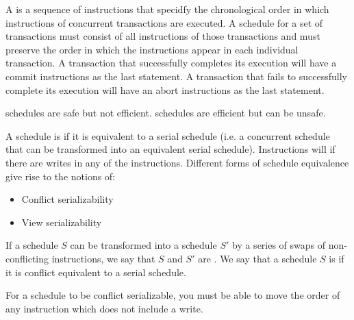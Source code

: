 \documentclass{article}
\begin{document}
A  is a sequence of instructions that specidfy the chronological order in which instructions of concurrent transactions are executed. A schedule for a set of transactions must consist of all instructions of those transactions and must preserve the order in which the instructions appear in each individual transaction. A transaction that successfully completes its execution will have a commit instructions as the last statement. A transaction that fails to successfully complete its execution will have an abort instructions as the last statement. \\ 

\begin{remark}
   schedules are safe but not efficient.  schedules are efficient but can be unsafe. 
\end{remark}

A schedule is  if it is equivalent to a serial schedule (i.e. a concurrent schedule that can be transformed into an equivalent serial schedule). Instructions will  if there are writes in any of the instructions. Different forms of schedule equivalence give rise to the notions of: 
\begin{itemize}
  \item Conflict serializability 
  \item View serializability
\end{itemize}

If a schedule $S$ can be transformed into a schedule $S'$ by a series of swaps of non-conflicting instructions, we say that $S$ and $S'$ are . We say that a schedule $S$ is  if it is conflict equivalent to a serial schedule. \\ 

\begin{remark}
  For a schedule to be conflict serializable, you must be able to move the order of any instruction which does not include a write. 
\end{remark}
\end{document}
